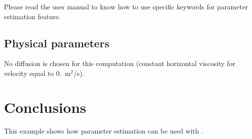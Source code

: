 Please read the  user manual to know how to use specific keywords
for parameter estimation feature.

\subsection{Physical parameters}

No diffusion is chosen for this computation (constant horizontal viscosity for
velocity equal to 0.~m$^2$/s).

\section{Conclusions}

This example shows how parameter estimation can be used with .
